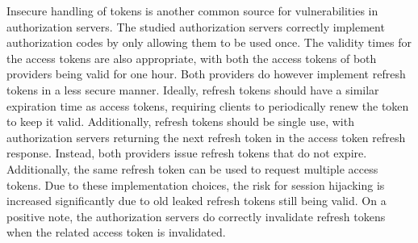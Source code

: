 Insecure handling of tokens is another common source for vulnerabilities in authorization servers.
The studied authorization servers correctly implement authorization codes by only allowing them to be used once.
The validity times for the access tokens are also appropriate, with both the access tokens of both providers being valid for one hour.
Both providers do however implement refresh tokens in a less secure manner.
Ideally, refresh tokens should have a similar expiration time as access tokens, requiring clients to periodically renew the token to keep it valid.
Additionally, refresh tokens should be single use, with authorization servers returning the next refresh token in the access token refresh response.
Instead, both providers issue refresh tokens that do not expire.
Additionally, the same refresh token can be used to request multiple access tokens.
Due to these implementation choices, the risk for session hijacking is increased significantly due to old leaked refresh tokens still being valid.
On a positive note, the authorization servers do correctly invalidate refresh tokens when the related access token is invalidated.
